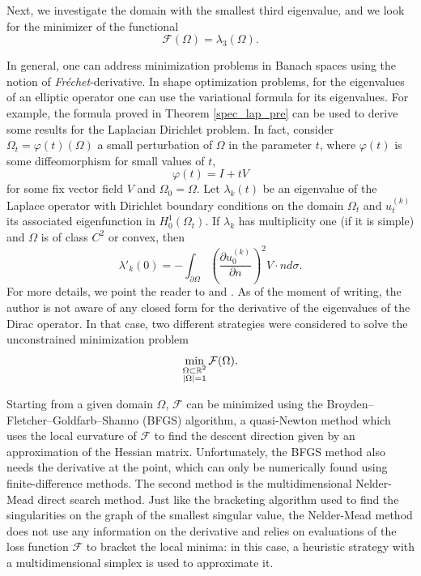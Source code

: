 Next, we investigate the domain with the smallest third eigenvalue, and we look for the minimizer of the functional
\begin{equation*}%
    \mathcal{F}(\Omega) = \lambda_3(\Omega).
\end{equation*}

In general, one can address minimization problems in Banach spaces using the notion of \textit{Fréchet}-derivative. In shape optimization problems, for the eigenvalues of an elliptic operator one can use the variational formula for its eigenvalues. For example, the formula proved in Theorem \ref{spec_lap_pre} can be used to derive some results for the Laplacian Dirichlet problem. In fact, consider \(\Omega_t = \varphi(t)(\Omega)\) a small perturbation of \(\Omega\) in the parameter \(t\), where \(\varphi(t)\) is some diffeomorphism for small values of \(t\), 
\[
    \varphi(t) = I + t V
\]
for some fix vector field \(V\) and \(\Omega_0 = \Omega\). Let  \(\lambda_k(t)\) be an eigenvalue of the Laplace operator with Dirichlet boundary conditions on the domain \(\Omega_t\) and \(u^{(k)}_t\) its associated eigenfunction in \(H^1_0(\Omega_t)\). If \(\lambda_k\) has multiplicity one (if it is simple) and \(\Omega\) is of class \(C^2\) or convex, then
\[
    \lambda'_k(0) =- \int_{\partial\Omega} \left(\frac{\partial u^{(k)}_0}{\partial n}\right)^2 V\cdot n d \sigma.
\]
For more details, we point the reader to \cite{henrot2006extremum} and \cite{kato2013perturbation}.
As of the moment of writing, the author is not aware of any closed form for the derivative of the eigenvalues of the Dirac operator. In that case, two different strategies were considered to solve the unconstrained minimization problem
\begin{equation}\label{dirac_unconstrained_min_lambda_3}
    \min_{\substack{\Omega \subset \mathbb{R}^2 \\ \abs{\Omega}=1}} \mathcal{F}(\Omega).
\end{equation}

Starting from a given domain \(\Omega\), \(\mathcal{F}\) can be minimized using the Broyden–Fletcher–Goldfarb–Shanno (\ac{BFGS}) algorithm, a quasi-Newton method which uses the local curvature of \(\mathcal{F}\) to find the descent direction given by an approximation of the Hessian matrix. Unfortunately, the \ac{BFGS} method also needs the derivative at the point, which can only be numerically found using finite-difference methods. The second method is the multidimensional Nelder-Mead direct search method. Just like the bracketing algorithm used to find the singularities on the graph of the smallest singular value, the Nelder-Mead method does not use any information on the derivative and relies on evaluations of the loss function \(\mathcal{F}\) to bracket the local minima: in this case, a heuristic strategy with a multidimensional simplex is used to approximate it.

